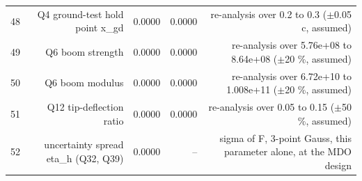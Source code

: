 \begin{table}[htbp]
{\begin{tabular}{lrrrr}
48 & Q4 ground-test hold point x\_gd & 0.0000 & 0.0000 & re-analysis over 0.2 to 0.3 ($\pm$0.05 c, assumed) \\
49 & Q6 boom strength & 0.0000 & 0.0000 & re-analysis over 5.76e+08 to 8.64e+08 ($\pm$20 \%, assumed) \\
50 & Q6 boom modulus & 0.0000 & 0.0000 & re-analysis over 6.72e+10 to 1.008e+11 ($\pm$20 \%, assumed) \\
51 & Q12 tip-deflection ratio & 0.0000 & 0.0000 & re-analysis over 0.05 to 0.15 ($\pm$50 \%, assumed) \\
52 & uncertainty spread eta\_h (Q32, Q39) & 0.0000 & -- & sigma of F, 3-point Gauss, this parameter alone, at the MDO design \\
\bottomrule
\end{tabular}}
\end{table}
